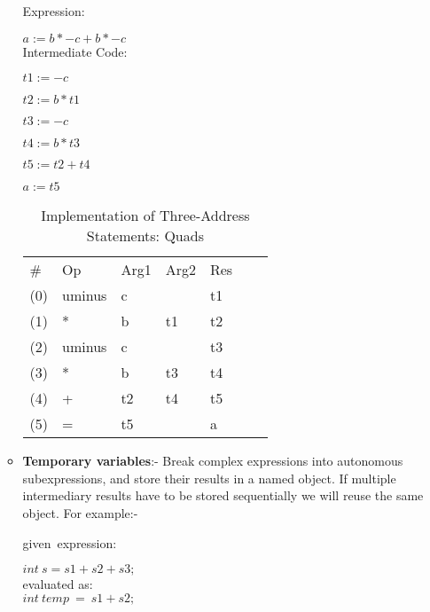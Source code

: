 \documentclass{sigchi}
\begin{document}
\begin{enumerate}
\begin{itemize}
		 
Expression:

\hspace{1 in}$a := b * -c + b * -c$\\
Intermediate Code:

\hspace{1 in}$t1 := - c$

\hspace{1 in}$t2 := b * t1$

\hspace{1 in}$t3 := - c$

\hspace{1 in}$t4 := b * t3$

\hspace{1 in}$t5 := t2 + t4$

\hspace{1 in}$a  := t5$

        
        \begin{table}[ht]
		
		\centering
        \caption{}
           \begin{tabular}{lllllll}
           \hline \hline 
          \#  & Op     & Arg1 & Arg2 & Res \\
          (0) & uminus & c    &      & t1  \\
          (1) & *      & b    & t1   & t2  \\
          (2) & uminus & c    &      & t3  \\
          (3) & *      & b    & t3   & t4  \\
          (4) & +      & t2   & t4   & t5  \\
          (5) & =      & t5   &      & a  
          \end{tabular}
          \caption*{Implementation of Three-Address Statements: Quads}
          
          \label{table:nonlin}
		\end{table}
		\item \textbf{Temporary variables}:- Break complex expressions into autonomous subexpressions, and store their results in a named object. If multiple intermediary results have to be stored sequentially we will reuse the same object. For example:-

given\ expression:

\hspace{1 in}$int\ s=s1+s2+s3;$\\
evaluated as:\\

\hspace{1 in}$int\ temp\ =\ s1+s2;$


\end{itemize}
\end{enumerate}
\end{document}
